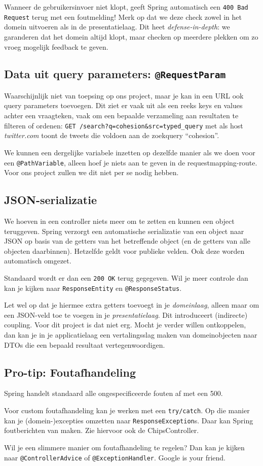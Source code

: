 Wanneer de gebruikersinvoer niet klopt, geeft Spring automatisch 
een \texttt{400 Bad Request} terug met een foutmelding!
Merk op dat we deze check zowel in het domein uitvoeren als in de presentatielaag.
Dit heet \textit{defense-in-depth}: we garanderen dat het domein altijd klopt,
maar checken op meerdere plekken om zo vroeg mogelijk feedback te geven. 

\subsection{Data uit query parameters: \texttt{@RequestParam}}
Waarschijnlijk niet van toepsing op ons project,
maar je kan in een URL ook query parameters toevoegen.
Dit ziet er vaak uit als een reeks keys en values achter een vraagteken,
vaak om een bepaalde verzameling aan resultaten te filteren of ordenen:
\texttt{GET /search?q=cohesion&src=typed_query} met als host \textit{twitter.com} 
toont de tweets die voldoen aan de zoekquery ``cohesion''.

We kunnen een dergelijke variabele inzetten op dezelfde manier als we doen voor 
een \texttt{@PathVariable}, alleen hoef je niets aan te geven in de 
requestmapping-route. Voor ons project zullen we dit niet per se nodig hebben.

\subsection{JSON-serializatie}
We hoeven in een controller niets meer om te zetten en kunnen een object 
teruggeven. Spring verzorgt een automatische serializatie van een object naar JSON
op basis van de getters van het betreffende object (en de getters van alle objecten daarbinnen).
Hetzelfde geldt voor publieke velden. Ook deze worden automatisch omgezet.

Standaard wordt er dan een \texttt{200 OK} terug gegegeven.
Wil je meer controle dan kan je kijken naar \texttt{ResponseEntity}
en \texttt{@ResponseStatus}.

Let wel op dat je hiermee extra getters toevoegt in je \textit{domeinlaag}, alleen maar 
om een JSON-veld toe te voegen in je \textit{presentatielaag}. Dit introduceert (indirecte)
coupling. Voor dit project is dat niet erg. Mocht je verder willen ontkoppelen, dan kan je 
in je applicatielaag een vertalingsslag maken van domeinobjecten naar DTOs die een bepaald 
resultaat vertegenwoordigen.

\subsection{Pro-tip: Foutafhandeling}
Spring handelt standaard alle ongespecificeerde fouten af met een 500.

Voor custom foutafhandeling kan je werken met een \texttt{try/catch}. 
Op die manier kan je (domein-)excepties omzetten naar
\texttt{ResponseException}s. Daar kan Spring foutberichten van maken.
Zie hiervoor ook de ChipsController.

Wil je een slimmere manier om foutafhandeling te regelen? Dan kan je 
kijken naar \texttt{@ControllerAdvice} of \texttt{@ExceptionHandler}.
Google is your friend.